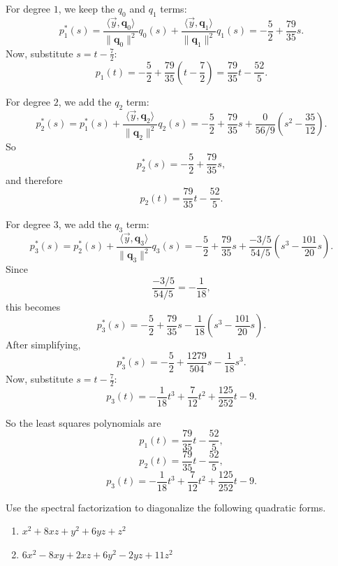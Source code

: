 \documentclass[10pt]{extarticle}
\begin{document}
\begin{enumerate}[label=(\alph*)]
For degree $1$, we keep the $q_0$ and $q_1$ terms:
\[
p_1^{\ast}(s)
=\frac{\langle \vec{y},\mathbf{q}_0\rangle}{\|\mathbf{q}_0\|^2}q_0(s)
+\frac{\langle \vec{y},\mathbf{q}_1\rangle}{\|\mathbf{q}_1\|^2}q_1(s)
=-\frac{5}{2}+\frac{79}{35}s.
\]
Now, substitute $s=t-\frac{7}{2}$:
\[
p_1(t)=-\frac{5}{2}+\frac{79}{35}\left(t-\frac{7}{2}\right)
=\frac{79}{35}t-\frac{52}{5}.
\]

For degree $2$, we add the $q_2$ term:
\[
p_2^{\ast}(s)
=p_1^{\ast}(s)
+\frac{\langle \vec{y},\mathbf{q}_2\rangle}{\|\mathbf{q}_2\|^2}q_2(s)
=-\frac{5}{2}+\frac{79}{35}s+\frac{0}{56/9}\left(s^2-\frac{35}{12}\right).
\]
So
\[
p_2^{\ast}(s)=-\frac{5}{2}+\frac{79}{35}s,
\]
and therefore
\[
p_2(t)=\frac{79}{35}t-\frac{52}{5}.
\]

For degree $3$, we add the $q_3$ term:
\[
p_3^{\ast}(s)
=p_2^{\ast}(s)
+\frac{\langle \vec{y},\mathbf{q}_3\rangle}{\|\mathbf{q}_3\|^2}q_3(s)
=-\frac{5}{2}+\frac{79}{35}s+\frac{-3/5}{54/5}\left(s^3-\frac{101}{20}s\right).
\]
Since
\[
\frac{-3/5}{54/5}=-\frac{1}{18},
\]
this becomes
\[
p_3^{\ast}(s)=
-\frac{5}{2}
+\frac{79}{35}s
-\frac{1}{18}\left(s^3-\frac{101}{20}s\right).
\]
After simplifying,
\[
p_3^{\ast}(s)=
-\frac{5}{2}
+\frac{1279}{504}s
-\frac{1}{18}s^3.
\]
Now, substitute $s=t-\frac{7}{2}$:
\[
p_3(t)=
-\frac{1}{18}t^3
+\frac{7}{12}t^2
+\frac{125}{252}t
-9.
\]

So the least squares polynomials are
\[
\boxed{p_1(t)=\frac{79}{35}t-\frac{52}{5}},
\]
\[
\boxed{p_2(t)=\frac{79}{35}t-\frac{52}{5}},
\]
\[
\boxed{p_3(t)=-\frac{1}{18}t^3+\frac{7}{12}t^2+\frac{125}{252}t-9.}
\]
\end{enumerate}

\newpage

\begin{problem}[Problem 4]
Use the spectral factorization to diagonalize the following quadratic forms.
\begin{enumerate}[label=(\alph*)]
\item $x^2+8xz+y^2+6yz+z^2$
\item $6x^2-8xy+2xz+6y^2-2yz+11z^2$
\end{enumerate}
\end{problem}
\end{document}
